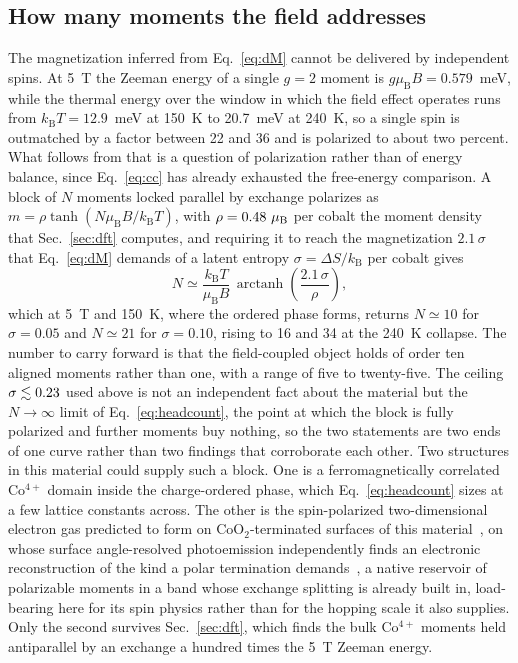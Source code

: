 \documentclass[reprint,twocolumn,prb,amsmath,amssymb,superscriptaddress,floatfix]{revtex4-2}
\newcommand{\kB}{k_{\mathrm{B}}}
\newcommand{\muBs}{\mu_{\mathrm{B}}}
\begin{document}
\subsection{How many moments the field addresses}

The magnetization inferred from Eq.~\eqref{eq:dM} cannot be delivered by independent spins. At
5~T the Zeeman energy of a single $g=2$ moment is $g\muBs B=0.579$~meV, while the thermal energy
over the window in which the field effect operates runs from $\kB T=12.9$~meV at 150~K to
20.7~meV at 240~K, so a single spin is outmatched by a factor between 22 and 36 and is polarized
to about two percent. What follows from that is a question of polarization rather than of energy
balance, since Eq.~\eqref{eq:cc} has already exhausted the free-energy comparison. A block of
$N$ moments locked parallel by exchange polarizes as $m=\rho\tanh(N\muBs B/\kB T)$, with
$\rho=\msatRow~\muBs$ per cobalt the moment density that Sec.~\ref{sec:dft} computes, and
requiring it to reach the magnetization $2.1\,\sigma$ that Eq.~\eqref{eq:dM} demands of a latent
entropy $\sigma=\Delta S/\kB$ per cobalt gives
\begin{equation}
  N \simeq \frac{\kB T}{\muBs B}\,
  \operatorname{arctanh}\!\left(\frac{2.1\,\sigma}{\rho}\right),
  \label{eq:headcount}
\end{equation}
which at 5~T and 150~K, where the ordered phase forms, returns $N\simeq10$ for $\sigma=0.05$ and
$N\simeq21$ for $\sigma=0.10$, rising to 16 and 34 at the 240~K collapse. The number to carry
forward is that the field-coupled object holds of order ten aligned moments rather than one,
with a range of five to twenty-five. The ceiling $\sigma\lesssim0.23$ used above is
not an independent fact about the material but the $N\to\infty$ limit of
Eq.~\eqref{eq:headcount}, the point at which the block is fully polarized and further moments
buy nothing, so the two statements are two ends of one curve rather than two findings that
corroborate each other. Two structures in this material could supply such a block. One is a
ferromagnetically correlated Co$^{4+}$ domain inside the charge-ordered phase, which
Eq.~\eqref{eq:headcount} sizes at a few lattice constants across. The other is the
spin-polarized two-dimensional electron gas predicted to form on CoO$_2$-terminated surfaces of
this material~\cite{Radha2021}, on whose surface angle-resolved photoemission independently finds
an electronic reconstruction of the kind a polar termination
demands~\cite{Okamoto2017}, a native reservoir of polarizable moments in a band whose
exchange splitting is already built in, load-bearing here for its spin physics rather than for
the hopping scale it also supplies. Only the second survives Sec.~\ref{sec:dft}, which finds the
bulk Co$^{4+}$ moments held antiparallel by an exchange a hundred times the 5~T Zeeman energy.
\end{document}
